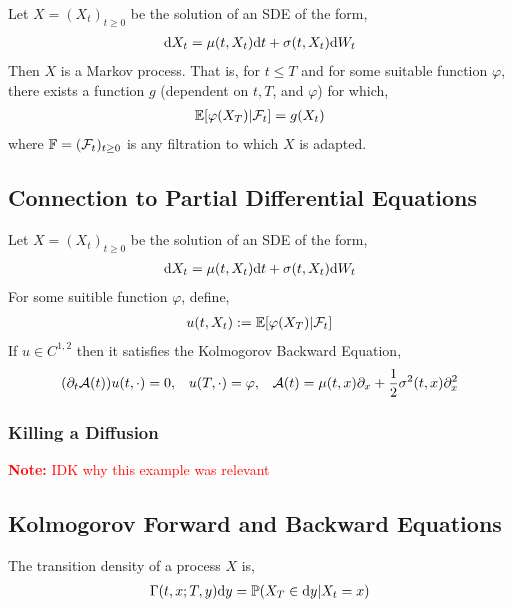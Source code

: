 \documentclass[12pt]{article}
\newcommand{\note}[1]{\textcolor{red}{\textbf{Note:} #1}}
\begin{document}
\begin{theorem}
Let \( X = (X_t)_{t\geq 0} \) be the solution of an SDE of the form,
\begin{align*}
    \mathrm{d} X_t = \mu(t,X_t)\mathrm{d} t + \sigma(t,X_t)\mathrm{d} W_t
\end{align*}
Then \( X \) is a Markov process. That is, for \( t\leq T \) and for some suitable function \( \varphi \), there exists a function \( g \) (dependent on \( t,T \), and \( \varphi \)) for which,
\begin{align*}
    \mathbb{E}[\varphi(X_T) | \mathcal{F}_t] = g(X_t)
\end{align*}
where \( \mathbb{F} = (\mathcal{F}_t)_{t\geq 0} \) is any filtration to which \( X \) is adapted.
\end{theorem}

\subsection{Connection to Partial Differential Equations}

\begin{theorem}
Let \( X = (X_t)_{t\geq 0} \) be the solution of an SDE of the form,
\begin{align*}
    \mathrm{d} X_t = \mu(t,X_t)\mathrm{d} t + \sigma(t,X_t)\mathrm{d} W_t
\end{align*}
For some suitible function \( \varphi \), define,
\begin{align*}
    u(t,X_t):= \mathbb{E}[\varphi(X_T)|\mathcal{F}_t]
\end{align*}
If \( u\in C^{1,2} \) then it satisfies the Kolmogorov Backward Equation,
\begin{align*}
    (\partial_t \mathcal{A}(t)) u(t,\cdot) = 0, && u(T,\cdot) = \varphi, && \mathcal{A}(t) = \mu(t,x) \partial_x + \frac{1}{2}\sigma^2(t,x)\partial^2_x
\end{align*}

\end{theorem}

\subsubsection{Killing a Diffusion}
\note{IDK why this example was relevant}

\subsection{Kolmogorov Forward and Backward Equations}
\begin{definition}
The transition density of a process \( X \) is,
\begin{align*}
    \Gamma(t,x;T,y) \mathrm{d} y = \mathbb{P}(X_T\in\mathrm{d} y | X_t = x)
\end{align*}
\end{definition}
\end{document}
